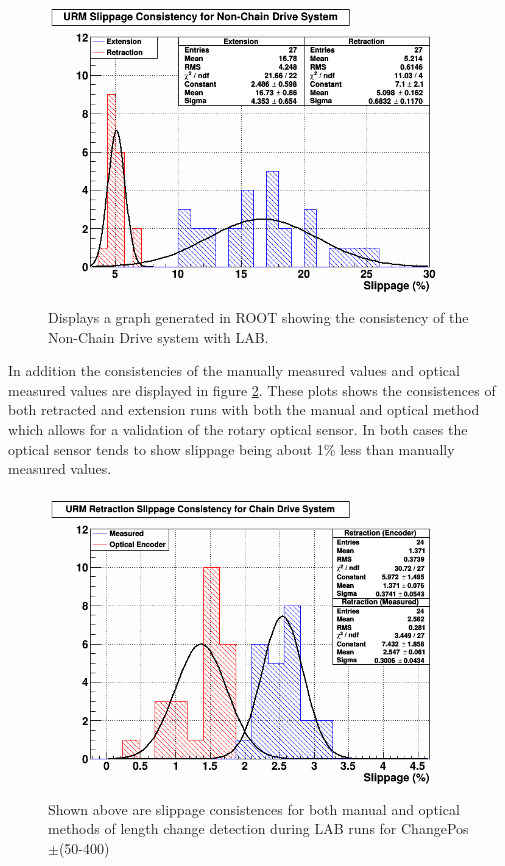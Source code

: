 \documentclass[paper=a4, fontsize=11pt]{scrartcl}
\numberwithin{equation}{section}		%
\numberwithin{figure}{section}			%
\numberwithin{table}{section}				%
\begin{document}
        \begin{figure}[h]
                \includegraphics[height=8cm]{fdat2}
                \caption{Displays a graph generated in ROOT showing the consistency of the Non-Chain Drive system with LAB.}
                \label{con2}
        \end{figure}
        
In addition the consistencies of the manually measured values and optical measured values are displayed in figure \ref{op}. These plots shows the consistences of both retracted and extension runs with both the manual and optical method which allows for a validation of the rotary optical sensor. In both cases the optical sensor tends to show slippage being about 1\% less than manually measured values.
        

       
        \begin{figure}[H]
                \includegraphics[height=8cm]{fdat3}
                \caption{Shown above are slippage consistences for both manual and optical methods of length change detection during LAB runs for ChangePos$\pm$(50-400)}
				\label{op}
        \end{figure}%
       
\end{document}
